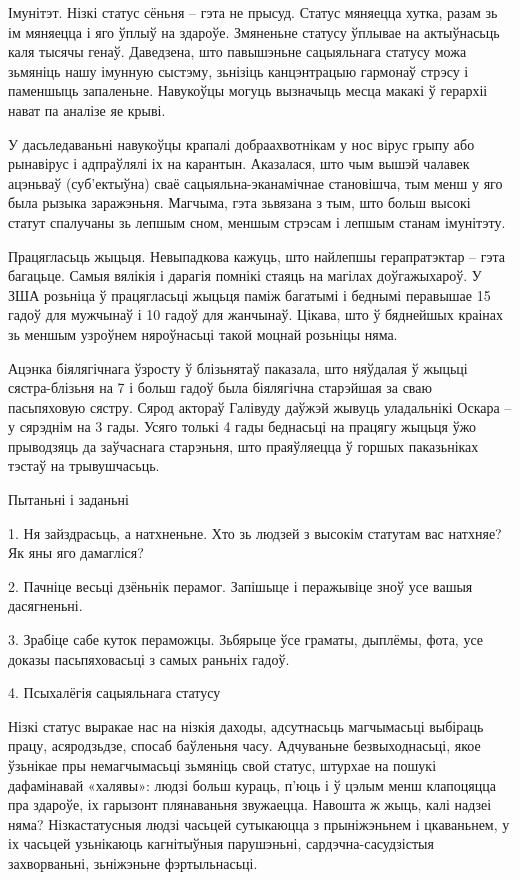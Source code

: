 Імунітэт. Нізкі статус сёньня – гэта не прысуд. Статус мяняецца хутка, разам зь ім мяняецца і яго ўплыў на здароўе. Змяненьне статусу ўплывае на актыўнасьць каля тысячы генаў. Даведзена, што павышэньне сацыяльнага статусу можа зьмяніць нашу імунную сыстэму, зьнізіць канцэнтрацыю гармонаў стрэсу і паменшыць запаленьне. Навукоўцы могуць вызначыць месца макакі ў герархіі нават па аналізе яе крыві.

У дасьледаваньні навукоўцы крапалі добраахвотнікам у нос вірус грыпу або рынавірус і адпраўлялі іх на карантын. Аказалася, што чым вышэй чалавек ацэньваў (суб'ектыўна) сваё сацыяльна-эканамічнае становішча, тым менш у яго была рызыка заражэньня. Магчыма, гэта зьвязана з тым, што больш высокі статут спалучаны зь лепшым сном, меншым стрэсам і лепшым станам імунітэту.

Працягласьць жыцьця. Невыпадкова кажуць, што найлепшы герапратэктар – гэта багацьце. Самыя вялікія і дарагія помнікі стаяць на магілах доўгажыхароў. У ЗША розьніца ў працягласьці жыцьця паміж багатымі і беднымі перавышае 15 гадоў для мужчынаў і 10 гадоў для жанчынаў. Цікава, што ў бяднейшых краінах зь меншым узроўнем няроўнасьці такой моцнай розьніцы няма.

Ацэнка біялягічнага ўзросту ў блізьнятаў паказала, што няўдалая ў жыцьці сястра-блізьня на 7 і больш гадоў была біялягічна старэйшая за сваю пасьпяховую сястру. Сярод актораў Галівуду даўжэй жывуць уладальнікі Оскара – у сярэднім на 3 гады. Усяго толькі 4 гады беднасьці на працягу жыцьця ўжо прыводзяць да заўчаснага старэньня, што праяўляецца ў горшых паказьніках тэстаў на трывушчасьць.

Пытаньні і заданьні

1. Ня зайздрасьць, а натхненьне. Хто зь людзей з высокім статутам вас натхняе? Як яны яго дамагліся?

2. Пачніце весьці дзёньнік перамог. Запішыце і перажывіце зноў усе вашыя дасягненьні.

3. Зрабіце сабе куток пераможцы. Зьбярыце ўсе граматы, дыплёмы, фота, усе доказы пасьпяховасьці з самых раньніх гадоў.


4. Псыхалёгія сацыяльнага статусу

Нізкі статус выракае нас на нізкія даходы, адсутнасьць магчымасьці выбіраць працу, асяродзьдзе, спосаб баўленьня часу. Адчуваньне безвыходнасьці, якое ўзьнікае пры немагчымасьці зьмяніць свой статус, штурхае на пошукі дафамінавай «халявы»: людзі больш кураць, п'юць і ў цэлым менш клапоцяцца пра здароўе, іх гарызонт плянаваньня звужаецца. Навошта ж жыць, калі надзеі няма? Нізкастатусныя людзі часьцей сутыкаюцца з прыніжэньнем і цкаваньнем, у іх часьцей узьнікаюць кагнітыўныя парушэньні, сардэчна-сасудзістыя захворваньні, зьніжэньне фэртыльнасьці.

